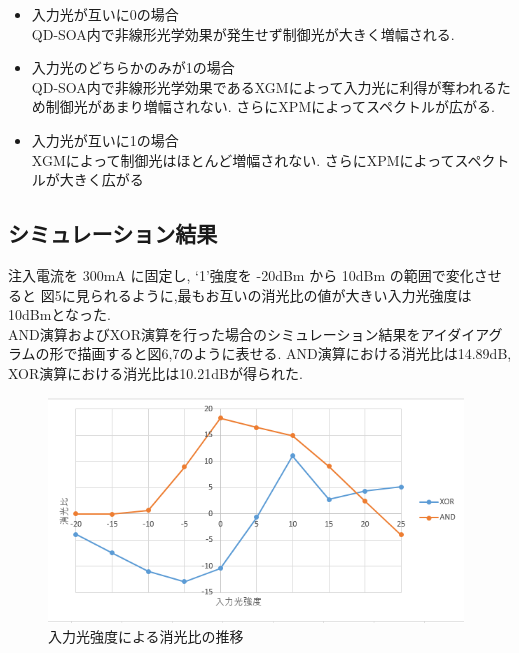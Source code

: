 \documentclass[dvipdfmx]{ujarticle}
\begin{document}
\begin{itemize}
  \item 入力光が互いに0の場合 \\
  QD-SOA内で非線形光学効果が発生せず制御光が大きく増幅される.
  \item 入力光のどちらかのみが1の場合 \\
  QD-SOA内で非線形光学効果であるXGMによって入力光に利得が奪われるため制御光があまり増幅されない.
  さらにXPMによってスペクトルが広がる.
  \item 入力光が互いに1の場合 \\
  XGMによって制御光はほとんど増幅されない.
  さらにXPMによってスペクトルが大きく広がる
\end{itemize}

\subsection{シミュレーション結果}
注入電流を 300mA に固定し, `1'強度を -20dBm から 10dBm の範囲で変化させると
図5に見られるように,最もお互いの消光比の値が大きい入力光強度は10dBmとなった.\\
AND演算およびXOR演算を行った場合のシミュレーション結果をアイダイアグラムの形で描画すると図6,7のように表せる.
AND演算における消光比は14.89dB, XOR演算における消光比は10.21dBが得られた.
\begin{figure}[H]
  \centering
  \includegraphics[width=11cm]{images/input_er.png}
  \caption{入力光強度による消光比の推移}
\end{figure}
\end{document}
